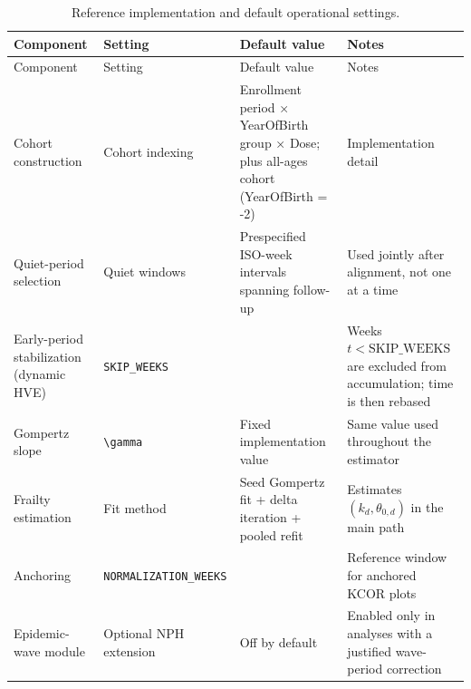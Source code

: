 \documentclass[
]{article}
\begin{document}
\begin{longtable}[]{@{}
  >{\raggedright\arraybackslash}p{}
  >{\raggedright\arraybackslash}p{}
  >{\raggedright\arraybackslash}p{}
  >{\raggedright\arraybackslash}p{}@{}}
\caption{Reference implementation and default operational
settings.}\label{tbl:si_defaults}\tabularnewline
\toprule\noalign{}
\begin{minipage}[b]{\linewidth}\raggedright
Component
\end{minipage} & \begin{minipage}[b]{\linewidth}\raggedright
Setting
\end{minipage} & \begin{minipage}[b]{\linewidth}\raggedright
Default value
\end{minipage} & \begin{minipage}[b]{\linewidth}\raggedright
Notes
\end{minipage} \\
\midrule\noalign{}
\endfirsthead
\toprule\noalign{}
\begin{minipage}[b]{\linewidth}\raggedright
Component
\end{minipage} & \begin{minipage}[b]{\linewidth}\raggedright
Setting
\end{minipage} & \begin{minipage}[b]{\linewidth}\raggedright
Default value
\end{minipage} & \begin{minipage}[b]{\linewidth}\raggedright
Notes
\end{minipage} \\
\midrule\noalign{}
\endhead
\bottomrule\noalign{}
\endlastfoot
Cohort construction & Cohort indexing & Enrollment period × YearOfBirth
group × Dose; plus all-ages cohort (YearOfBirth = -2) & Implementation
detail \\
Quiet-period selection & Quiet windows & Prespecified ISO-week intervals
spanning follow-up & Used jointly after alignment, not one at a time \\
Early-period stabilization (dynamic HVE) & \texttt{SKIP\_WEEKS} & 2 &
Weeks \(t < \mathrm{SKIP\_WEEKS}\) are excluded from accumulation; time
is then rebased \\
Gompertz slope & \texttt{\textbackslash{}gamma} & Fixed implementation
value & Same value used throughout the estimator \\
Frailty estimation & Fit method & Seed Gompertz fit + delta iteration +
pooled refit & Estimates \((k_d,\theta_{0,d})\) in the main path \\
Anchoring & \texttt{NORMALIZATION\_WEEKS} & 4 & Reference window for
anchored KCOR plots \\
Epidemic-wave module & Optional NPH extension & Off by default & Enabled
only in analyses with a justified wave-period correction \\
\end{longtable}
\end{document}
